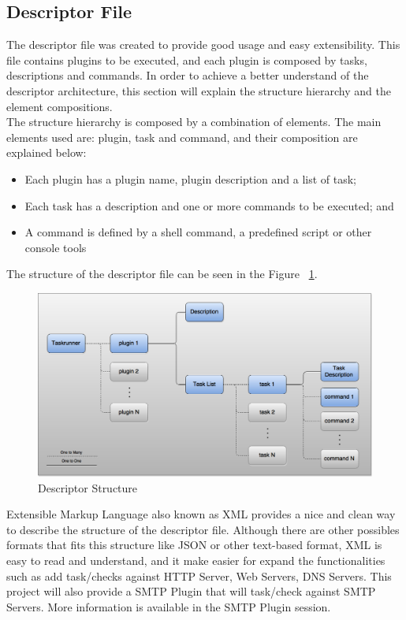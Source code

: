 \documentclass[a4paper, 12pt]{article}
\begin{document}
\subsection{Descriptor File}

	The descriptor file was created to provide good usage and easy extensibility. This file contains plugins to be executed, and each plugin is composed by
tasks, descriptions and commands. In order to achieve a better understand of the descriptor architecture, this section will explain the structure
hierarchy and the element compositions.\\

	The structure hierarchy is composed by a combination of elements. The main elements used are: plugin, task and command, and their composition are
explained below:

\begin{itemize}
\item Each plugin has a plugin name, plugin description and a list of task;
\item Each task has a description and one or more commands to be executed; and
\item A command is defined by a shell command, a predefined script or other console tools
\end{itemize}

\noindent
The structure of the descriptor file can be seen in the Figure ~\ref{img:diagram}.

\noindent
\begin{figure}
	\centering
	\includegraphics[width=\textwidth]{images/diagram.png}
	\caption{Descriptor Structure}
	\label{img:diagram}
\end{figure}

	Extensible Markup Language also known as XML provides a nice and clean way to describe the structure of the descriptor file. Although there are other
possibles formats that fits this structure like JSON or other text-based format, XML is easy to read and understand, and it make easier for expand the
functionalities such as add task/checks against HTTP Server, Web Servers, DNS Servers. This project will also provide a SMTP Plugin that will task/check
against SMTP Servers. More information is available in the SMTP Plugin session.\\
\end{document}
